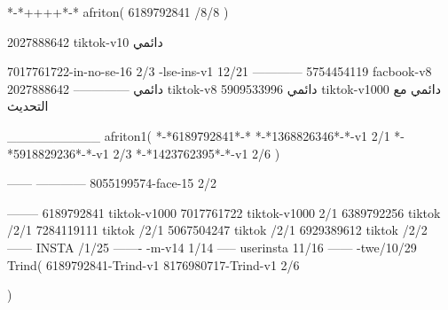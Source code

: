 *-*++++*-*
afriton(
6189792841 /8/8
)

2027888642 tiktok-v10
دائمي

7017761722-in-no-se-16 2/3
-lse-ins-v1 12/21
------------
5754454119 facbook-v8
دائمي
--------------
2027888642 tiktok-v8
دائمي
5909533996 tiktok-v1000
دائمي مع التحديث

__________
afriton1(
*-*6189792841*-*
*-*1368826346*-*-v1 2/1
*-*5918829236*-*-v1 2/3
*-*1423762395*-*-v1 2/6
)

------
------------
8055199574-face-15 2/2

--------
6189792841 tiktok-v1000
7017761722 tiktok-v1000 2/1
6389792256 tiktok /2/1
7284119111 tiktok /2/1
5067504247 tiktok /2/1
6929389612 tiktok /2/2
------
 INSTA /1/25
-------
-m-v14 1/14
-----
userinsta 11/16
------
-twe/10/29
Trind(
6189792841-Trind-v1 
8176980717-Trind-v1 2/6

)
